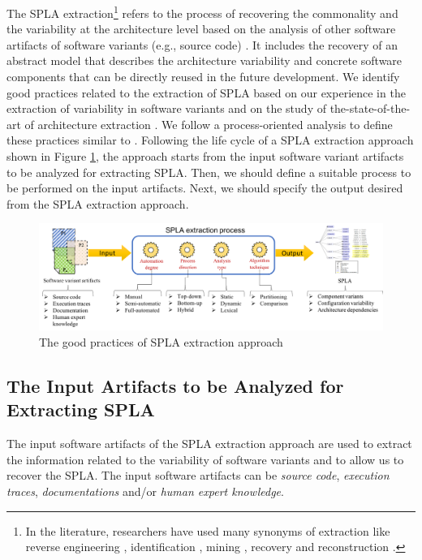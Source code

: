 \documentclass[graybox]{svmult}
\begin{document}
The SPLA extraction\footnote{In the literature, researchers have used many synonyms of extraction like reverse engineering \cite{shatnawi2017recovering}, identification \cite{mende2009evaluation}, mining \cite{Yuan2014}, recovery \cite{pinzger2004architecture} and reconstruction \cite{moshkenani2012improving}.} refers to the process of recovering the commonality and the variability at the architecture level based on the analysis of other software artifacts of software variants (e.g., source code) \cite{chikofsky1990reverse}. 
It includes the recovery of an abstract model that describes the architecture variability and concrete software components that can be directly reused in the future development.
We identify good practices related to the extraction of SPLA based on our experience in the extraction of variability in software variants and on the study of the-state-of-the-art of architecture extraction \cite{abdellatiftaxonomy,ducasse2009software,lima2017investigating}. 
We follow a process-oriented analysis to define these practices similar to \cite{abdellatiftaxonomy,ducasse2009software}. Following the life cycle of a SPLA extraction approach shown in Figure \ref{fig:SALife}, the approach starts from the input software variant artifacts to be analyzed for extracting SPLA. Then, we should define a suitable process to be performed on the input artifacts. Next, we should specify the output desired from the SPLA extraction approach.

\begin{figure}[!htbp]
	\begin{center}
		\includegraphics[width=\textwidth]{figs/process-oriented-desing.png}
	\end{center}
	\caption{The good practices of SPLA extraction approach}
	\label{fig:SALife}
\end{figure}

\subsection{The Input Artifacts to be Analyzed for Extracting SPLA}
The input software artifacts of the SPLA extraction approach are used to extract the information related to the variability of software variants and to allow us to recover the SPLA. The input software artifacts can be \textit{source code}, \textit{execution traces}, \textit{documentations} and/or \textit{human expert knowledge}.
\end{document}
